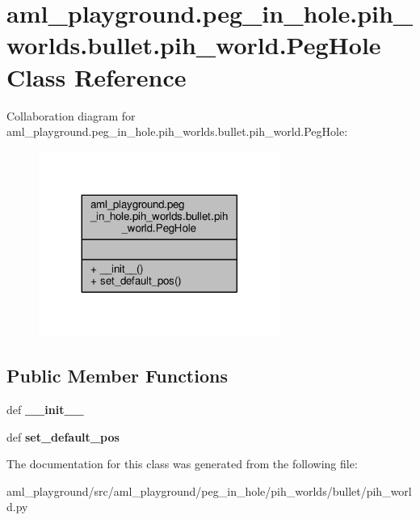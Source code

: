 \hypertarget{classaml__playground_1_1peg__in__hole_1_1pih__worlds_1_1bullet_1_1pih__world_1_1_peg_hole}{\section{aml\-\_\-playground.\-peg\-\_\-in\-\_\-hole.\-pih\-\_\-worlds.\-bullet.\-pih\-\_\-world.\-Peg\-Hole Class Reference}
\label{classaml__playground_1_1peg__in__hole_1_1pih__worlds_1_1bullet_1_1pih__world_1_1_peg_hole}
}


Collaboration diagram for aml\-\_\-playground.\-peg\-\_\-in\-\_\-hole.\-pih\-\_\-worlds.\-bullet.\-pih\-\_\-world.\-Peg\-Hole\-:\nopagebreak
\begin{figure}[H]
\begin{center}
\leavevmode
\includegraphics[width=224pt]{classaml__playground_1_1peg__in__hole_1_1pih__worlds_1_1bullet_1_1pih__world_1_1_peg_hole__coll__graph}
\end{center}
\end{figure}
\subsection*{Public Member Functions}
\begin{DoxyCompactItemize}
\item 
\hypertarget{classaml__playground_1_1peg__in__hole_1_1pih__worlds_1_1bullet_1_1pih__world_1_1_peg_hole_a8761d09c7fb05eec0d391ed64db2aa89}{def {\bfseries \-\_\-\-\_\-init\-\_\-\-\_\-}}\label{classaml__playground_1_1peg__in__hole_1_1pih__worlds_1_1bullet_1_1pih__world_1_1_peg_hole_a8761d09c7fb05eec0d391ed64db2aa89}

\item 
\hypertarget{classaml__playground_1_1peg__in__hole_1_1pih__worlds_1_1bullet_1_1pih__world_1_1_peg_hole_a76e0018bf9d3b3aec413dff87023069e}{def {\bfseries set\-\_\-default\-\_\-pos}}\label{classaml__playground_1_1peg__in__hole_1_1pih__worlds_1_1bullet_1_1pih__world_1_1_peg_hole_a76e0018bf9d3b3aec413dff87023069e}

\end{DoxyCompactItemize}


The documentation for this class was generated from the following file\-:\begin{DoxyCompactItemize}
\item 
aml\-\_\-playground/src/aml\-\_\-playground/peg\-\_\-in\-\_\-hole/pih\-\_\-worlds/bullet/pih\-\_\-world.\-py\end{DoxyCompactItemize}
